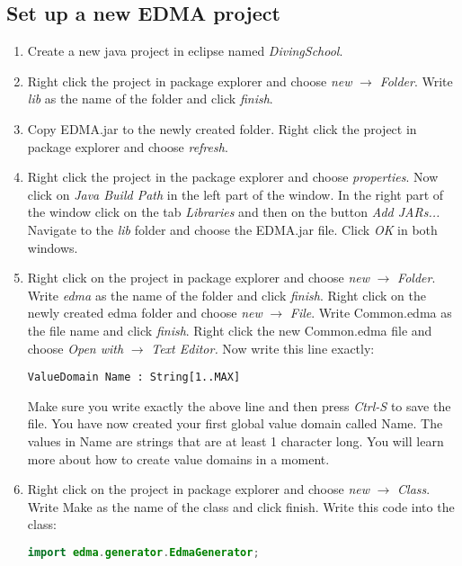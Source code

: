 \subsection{Set up a new EDMA project}
\begin{enumerate}
\item Create a new java project in eclipse named \emph{DivingSchool}.
\item Right click the project in package explorer and choose \emph{new}
\(\rightarrow\) \emph{Folder}. Write \emph{lib} as the name of the
folder and click \emph{finish}.
\item Copy EDMA.jar to the newly created folder. Right click the project
in package explorer and choose \emph{refresh}.
\item Right click the project in the package explorer and choose \emph{properties}.
Now click on \emph{Java Build Path} in the left part of the window.
In the right part of the window click on the tab \emph{Libraries}
and then on the button \emph{Add JARs... }Navigate to the \emph{lib}
folder and choose the EDMA.jar file. Click \emph{OK} in both windows.
\item Right click on the project in package explorer and choose \emph{new}
\(\rightarrow\) \emph{Folder}. Write \emph{edma} as the name of the
folder and click \emph{finish}. Right click on the newly created edma
folder and choose \emph{new} \(\rightarrow\) \emph{File}. Write Common.edma
as the file name and click \emph{finish}. Right click the new Common.edma
file and choose \emph{Open with} \(\rightarrow\) \emph{Text Editor.
}Now write this line exactly:
\begin{lstlisting}[basicstyle={\scriptsize}]
ValueDomain Name : String[1..MAX]
\end{lstlisting}
Make sure you write exactly the above line and then press \emph{Ctrl-S}
to save the file. You have now created your first global value domain
called Name. The values in Name are strings that are at least 1 character
long. You will learn more about how to create value domains in a moment.
\item Right click on the project in package explorer and choose \emph{new}
\(\rightarrow\) \emph{Class}. Write Make as the name of the class
and click finish. Write this code into the class:
\begin{lstlisting}[basicstyle={\scriptsize},breaklines=true,language=Java,tabsize=2]
import edma.generator.EdmaGenerator;


\end{lstlisting}
\end{enumerate}
